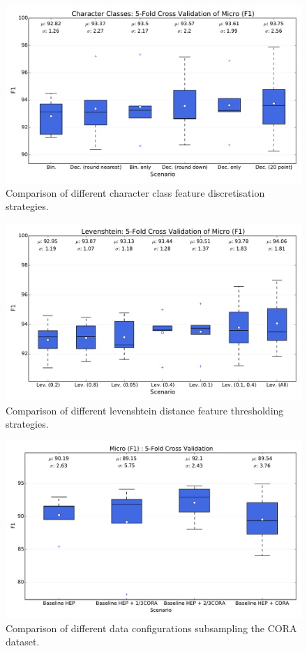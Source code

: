 \begin{figure}[h]
\center
\includegraphics[width=5.5in]{Figures/classes_micro.pdf}
\caption{Comparison of different character class feature discretisation strategies.}
\label{fig:classes_micro}
\end{figure}

\begin{figure}[h]
\center
\includegraphics[width=5.5in]{Figures/levenshtein_micro.pdf}
\caption{Comparison of different levenshtein distance feature thresholding strategies.}
\label{fig:levenshtein_micro}
\end{figure}

\begin{figure}[h]
\center
\includegraphics[width=5.5in]{Figures/micro_subsampling.pdf}
\caption{Comparison of different data configurations subsampling the CORA dataset.}
\label{fig:subsampling_micro}
\end{figure}

